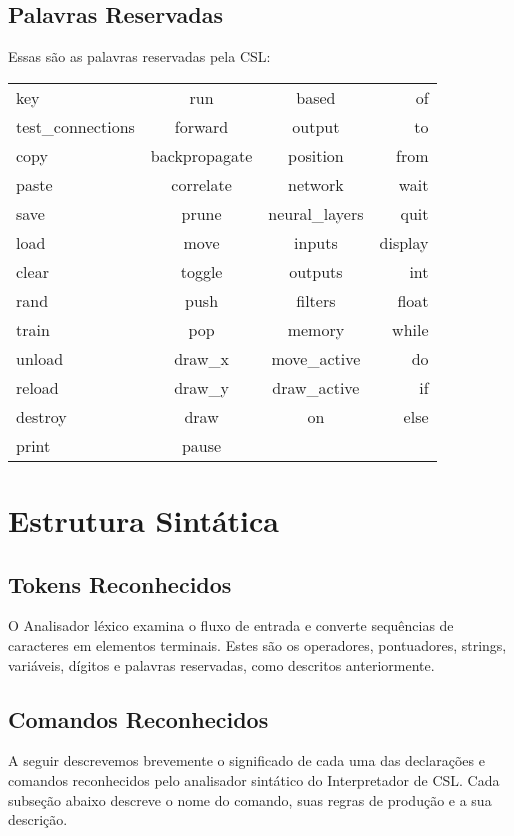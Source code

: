 \documentclass[a4paper,10pt]{article}
\begin{document}
  \subsection{Palavras Reservadas}
  Essas s\~ao as palavras reservadas pela CSL:
  \begin{center}
  \begin{tabular}{| l | c | c | r |}
    \hline
	  key & run & based & of \\
	  test\_connections & forward & output & to\\
	  copy & backpropagate & position & from\\
	  paste & correlate & network & wait\\
	  save & prune & neural\_layers & quit\\
	  load & move & inputs & display\\
	  clear & toggle & outputs & int\\
	  rand & push & filters & float \\
	  train & pop & memory & while\\
	  unload & draw\_x & move\_active & do\\
	  reload & draw\_y & draw\_active & if\\
	  destroy & draw & on & else\\
	  print & pause & & \\
    \hline
  \end{tabular}
  \end{center}

\section{Estrutura Sint\'atica}
  \subsection{Tokens Reconhecidos}
  O Analisador l\'exico examina o fluxo de entrada e converte sequ\^encias de caracteres em elementos terminais. Estes s\~ao os operadores, pontuadores, strings, vari\'aveis, d\'igitos e palavras reservadas, como descritos anteriormente.

  \subsection{Comandos Reconhecidos}
A seguir descrevemos brevemente o significado de cada uma das declara\c{c}\~oes e comandos reconhecidos pelo analisador sint\'atico do Interpretador de CSL.
Cada subse\c{c}\~ao abaixo descreve o nome do comando, suas regras de produ\c{c}\~ao e a sua descri\c{c}\~ao.
\end{document}
